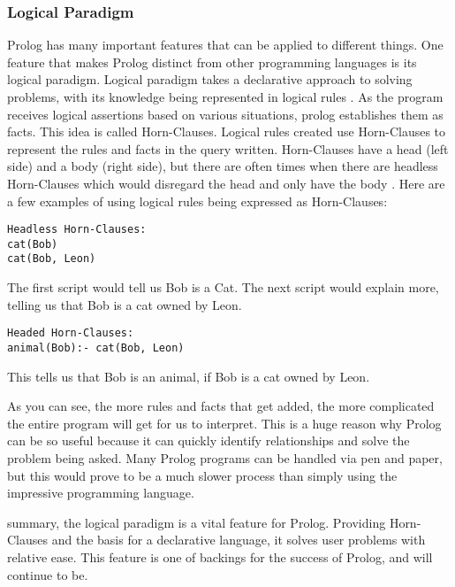 \documentclass{article}
\theoremstyle{theorem}
\theoremstyle{definition}
\theoremstyle{remark}
\begin{document}
\subsubsection{Logical Paradigm}
\noindent\newline Prolog has many important features that can be applied to different things. One feature that makes Prolog distinct from other programming languages is its logical paradigm. Logical paradigm takes a declarative approach to solving problems, with its knowledge being represented in logical rules \cite{(7)}. As the program receives logical assertions based on various situations, prolog establishes them as facts. This idea is called Horn-Clauses. Logical rules created use Horn-Clauses to represent the rules and facts in the query written. Horn-Clauses have a head (left side) and a body (right side), but there are often times when there are headless Horn-Clauses which would disregard the head and only have the body \cite{(8)}. Here are a few examples of using logical rules being expressed as Horn-Clauses:
\begin{verbatim}
Headless Horn-Clauses:
cat(Bob)
cat(Bob, Leon)
\end{verbatim}

\noindent\newline The first script would tell us Bob is a Cat. 
\noindent\newline The next script would explain more, telling us that Bob is a cat owned by Leon. 

\begin{verbatim}
Headed Horn-Clauses:
animal(Bob):- cat(Bob, Leon)
\end{verbatim}

\noindent\newline This tells us that Bob is an animal, if Bob is a cat owned by Leon. 


\noindent\newline As you can see, the more rules and facts that get added, the more complicated the entire program will get for us to interpret. This is a huge reason why Prolog can be so useful because it can quickly identify relationships and solve the problem being asked. Many Prolog programs can be handled via pen and paper, but this would prove to be a much slower process than simply using the impressive programming language. 

\noindent\newline summary, the logical paradigm is a vital feature for Prolog. Providing Horn-Clauses and the basis for a declarative language, it solves user problems with relative ease. This feature is one of backings for the success of Prolog, and will continue to be. 
\end{document}
